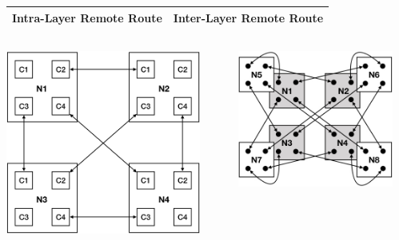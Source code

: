 \documentclass{beamer}
\begin{document}
\begin{frame}
\begin{table}
\begin{tabular}{C|C}
	\hline
	\textbf{Intra-Layer Remote Route} & \textbf{Inter-Layer Remote Route} \\
	\hline
\end{tabular}
\end{table}
%
\vspace{-1.0em}
%
\begin{columns}
	\begin{column}{0.5\textwidth}
		\begin{center}
			\includegraphics[width=0.9\textwidth]{intra_layer_nlnr}
		\end{center}
	\end{column}
	\begin{column}{0.5\textwidth}  %
		\begin{center}
			\includegraphics[width=0.9\textwidth]{inter_layer_nlnr}
		\end{center}
	\end{column}
\end{columns}

\end{frame}
\end{document}
